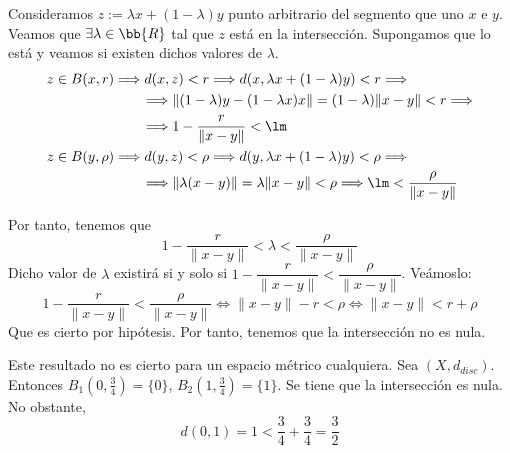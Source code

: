 \begin{ejercicio}
\begin{enumerate}
\begin{description}
\begin{comment}
            Por tanto, tenemos que $\exists z\in X$ tal que $d(x,y)\leq d(x,z)+d(y,z)< r+\rho$. Entonces:
            \begin{gather*}
                d(x,z)+d(y,z)< r+\rho 
            \end{gather*}
            \end{comment}

            Consideramos $z:= \lambda x+(1-\lambda)y$ punto arbitrario del segmento que uno $x$ e $y$. Veamos que $\exists \lambda\in \bb{R}$ tal que $z$ está en la intersección. Supongamos que lo está y veamos si existen dichos valores de $\lambda$.
            \begin{equation*}\begin{split}
                z\in B(x,r)&\Longrightarrow d(x,z)<r \Longrightarrow d(x,\lambda x +(1-\lambda)y)<r  \Longrightarrow \\
                & \qquad \Longrightarrow \|(1-\lambda)y -(1-\lambda x)x\| = (1-\lambda)\|x-y\|<r \Longrightarrow \\
                & \qquad \Longrightarrow 1-\frac{r}{\|x-y\|}<\lm\\
                z\in B(y,\rho)&\Longrightarrow d(y,z)<\rho \Longrightarrow d(y,\lambda x +(1-\lambda)y)<\rho \Longrightarrow \\
                & \qquad \Longrightarrow \|\lambda(x-y)\| = \lambda \|x-y\|<\rho \Longrightarrow \lm < \frac{\rho}{\|x-y\|}
            \end{split}\end{equation*}

            Por tanto, tenemos que
            \begin{equation*}
                1-\frac{r}{\|x-y\|} < \lambda < \frac{\rho}{\|x-y\|}
            \end{equation*}
            Dicho valor de $\lambda$ existirá si y solo si $1-\dfrac{r}{\|x-y\|} < \dfrac{\rho}{\|x-y\|}$. Veámoslo:
            \begin{equation*}
                1-\frac{r}{\|x-y\|} < \frac{\rho}{\|x-y\|} \Longleftrightarrow \|x-y\|-r<\rho \Longleftrightarrow \|x-y\|<r+\rho
            \end{equation*}
            Que es cierto por hipótesis. Por tanto, tenemos que la intersección no es nula.\\
        \end{description}
        Este resultado no es cierto para un espacio métrico cualquiera. Sea $(X,d_{disc})$. Entonces $B_1\left(0,\frac{3}{4}\right)=\{0\}$, $B_2\left(1, \frac{3}{4}\right)=\{1\}$. Se tiene que la intersección es nula. No obstante, $$d(0, 1)=1<\frac{3}{4} + \frac{3}{4}=\frac{3}{2}$$
        


\end{enumerate}
\end{ejercicio}
